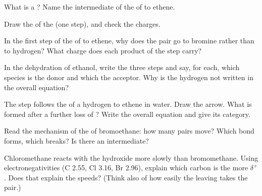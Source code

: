 \begin{exercise}[$\star$]\label{exo:g12:curly-arrows:5}
What is a ? Name the intermediate of the  of
 to ethene.
\end{exercise}

\begin{exercise}[$\star\star$]\label{exo:g12:curly-arrows:6}
Draw the  of the 
 (one step), and check the charges.
\end{exercise}

\begin{exercise}[$\star\star$]\label{exo:g12:curly-arrows:7}
In the first step of the  of  to ethene, why does the
 pair go to bromine rather than to hydrogen? What charge does
each product of the step carry?
\end{exercise}

\begin{exercise}[$\star\star$]\label{exo:g12:curly-arrows:8}
In the dehydration of ethanol, write the three steps and say, for each,
which species is the donor and which the acceptor. Why is the hydrogen
 not written in the overall equation?
\end{exercise}

\begin{exercise}[$\star\star$]\label{exo:g12:curly-arrows:9}
The step  follows the
 of a hydrogen  to ethene in water. Draw the arrow. What is
formed after a further loss of ? Write the overall equation and
give its category.
\end{exercise}

\begin{exercise}[$\star\star$]\label{exo:g12:curly-arrows:10}
Read the mechanism of the  of bromoethane: how many pairs
move? Which bond forms, which breaks? Is there an intermediate?
\end{exercise}

\begin{exercise}[$\star\star$]\label{exo:g12:curly-arrows:11}
Chloromethane reacts with the hydroxide  more slowly than
bromomethane. Using electronegativities (C 2.55, Cl 3.16, Br 2.96),
explain which carbon is the more $\delta^+$. Does that explain the
speeds? (Think also of how easily the leaving  takes the pair.)
\end{exercise}

